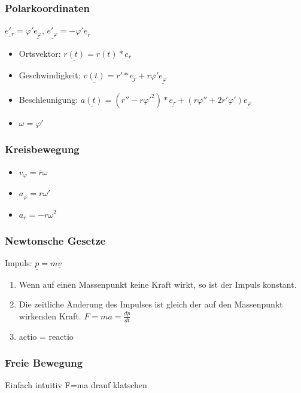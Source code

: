 \documentclass[11pt]{article}
\begin{document}
\subsubsection{Polarkoordinaten}
\label{sec:org3dc2ab3}
\(\underline{e'_r} = \varphi' \underline{e_{\varphi}}\), \(\underline{e'_\varphi} = -\varphi' \underline{e}_r\)
\begin{itemize}
\item Ortsvektor: \(\underline{r(t)} = r(t) * \underline{e_r}\)
\item Geschwindigkeit: \(\underline{v(t)} = r' * \underline{e_r} + r\varphi' \underline{e_\varphi}\)
\item Beschleunigung: \(\underline{a(t)} = (r''-r\varphi'^2) * \underline{e_r} + (r\varphi'' + 2r'\varphi') \underline{e_\varphi}\)
\item \(\omega = \varphi'\)
\end{itemize}

\subsubsection{Kreisbewegung}
\label{sec:org95b5a48}
\begin{itemize}
\item \(v_\varphi = \bar{r}\omega\)
\item \(a_\varphi = r\omega'\)
\item \(a_r = - r\omega^2\)
\end{itemize}

\subsubsection{Newtonsche Gesetze}
\label{sec:orge8b12c8}
Impuls: \(\underline{p} = m\underline{v}\)

\begin{enumerate}
\item Wenn auf einen Massenpunkt keine Kraft wirkt, so ist der Impuls konstant.
\item Die zeitliche Änderung des Impulses ist gleich der auf den Massenpunkt wirkenden Kraft. \(F = ma = \frac{dp}{dt}\)
\item actio = reactio
\end{enumerate}

\subsubsection{Freie Bewegung}
\label{sec:orge9a96e0}
Einfach intuitiv F=ma drauf klatschen
\end{document}
